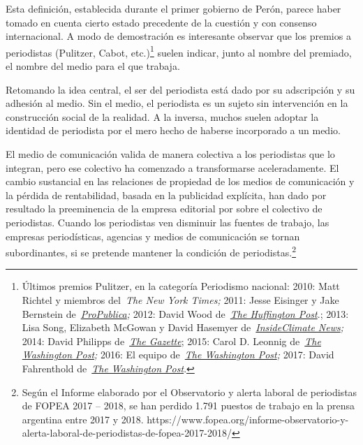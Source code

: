 Esta definición, establecida durante el primer gobierno de Perón, parece haber tomado en cuenta cierto estado precedente de la cuestión y con consenso internacional. A modo de demostración es interesante observar que los premios a periodistas (Pulitzer, Cabot, etc.)\footnote{Últimos premios Pulitzer, en la categoría Periodismo nacional: 2010: Matt Richtel y miembros del~\emph{The New York Times;} 2011: Jesse Eisinger y Jake Bernstein de~\emph{\href{https://es.wikipedia.org/wiki/ProPublica}{ProPublica};} 2012: David Wood de~\href{https://es.wikipedia.org/wiki/HuffPost}{\emph{The Huffington Post}}.; 2013: Lisa Song, Elizabeth McGowan y David Hasemyer de~\emph{\href{https://es.wikipedia.org/w/index.php?title=InsideClimate_News\&action=edit\&redlink=1}{InsideClimate News};} 2014: David Philipps de~\href{https://es.wikipedia.org/w/index.php?title=The_Gazette_(diario)\&action=edit\&redlink=1}{\emph{The Gazette}}; 2015: Carol D. Leonnig de~\emph{\href{https://es.wikipedia.org/wiki/The_Washington_Post}{The Washington Post};} 2016: El equipo de~\emph{\href{https://es.wikipedia.org/wiki/The_Washington_Post}{The Washington Post};} 2017: David Fahrenthold de~\href{https://es.wikipedia.org/wiki/The_Washington_Post}{\emph{The Washington Post}}.} suelen indicar, junto al nombre del premiado, el nombre del medio para el que trabaja.

Retomando la idea central, el ser del periodista está dado por su adscripción y su adhesión al medio. Sin el medio, el periodista es un sujeto sin intervención en la construcción social de la realidad. A la inversa, muchos suelen adoptar la identidad de periodista por el mero hecho de haberse incorporado a un medio.

El medio de comunicación valida de manera colectiva a los periodistas que lo integran, pero ese colectivo ha comenzado a transformarse aceleradamente. El cambio sustancial en las relaciones de propiedad de los medios de comunicación y la pérdida de rentabilidad, basada en la publicidad explícita, han dado por resultado la preeminencia de la empresa editorial por sobre el colectivo de periodistas. Cuando los periodistas ven disminuir las fuentes de trabajo, las empresas periodísticas, agencias y medios de comunicación se tornan subordinantes, si se pretende mantener la condición de periodistas.\footnote{Según el Informe elaborado por el Observatorio y alerta laboral de periodistas de FOPEA 2017 -- 2018, se han perdido 1.791 puestos de trabajo en la prensa argentina entre 2017 y 2018. https://www.fopea.org/informe-observatorio-y-alerta-laboral-de-periodistas-de-fopea-2017-2018/}

